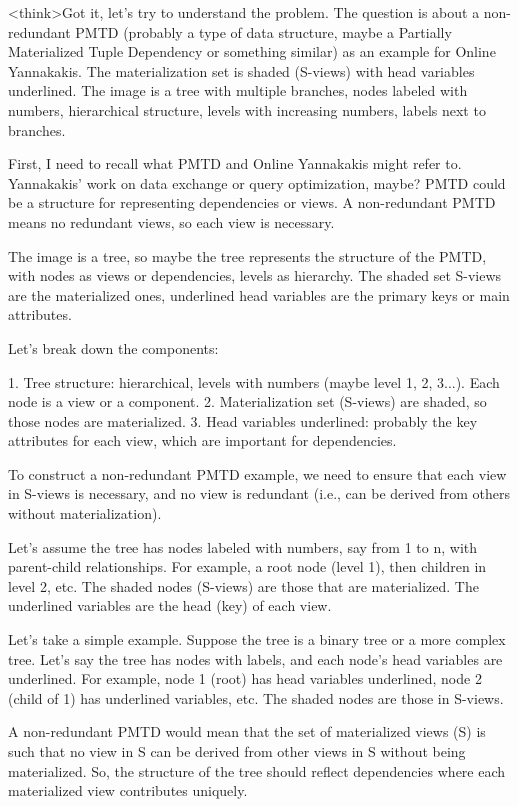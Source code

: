 <think>Got it, let's try to understand the problem. The question is about a non-redundant PMTD (probably a type of data structure, maybe a Partially Materialized Tuple Dependency or something similar) as an example for Online Yannakakis. The materialization set is shaded (S-views) with head variables underlined. The image is a tree with multiple branches, nodes labeled with numbers, hierarchical structure, levels with increasing numbers, labels next to branches.

First, I need to recall what PMTD and Online Yannakakis might refer to. Yannakakis' work on data exchange or query optimization, maybe? PMTD could be a structure for representing dependencies or views. A non-redundant PMTD means no redundant views, so each view is necessary.

The image is a tree, so maybe the tree represents the structure of the PMTD, with nodes as views or dependencies, levels as hierarchy. The shaded set S-views are the materialized ones, underlined head variables are the primary keys or main attributes.

Let's break down the components:

1. Tree structure: hierarchical, levels with numbers (maybe level 1, 2, 3...). Each node is a view or a component.
2. Materialization set (S-views) are shaded, so those nodes are materialized.
3. Head variables underlined: probably the key attributes for each view, which are important for dependencies.

To construct a non-redundant PMTD example, we need to ensure that each view in S-views is necessary, and no view is redundant (i.e., can be derived from others without materialization).

Let's assume the tree has nodes labeled with numbers, say from 1 to n, with parent-child relationships. For example, a root node (level 1), then children in level 2, etc. The shaded nodes (S-views) are those that are materialized. The underlined variables are the head (key) of each view.

Let's take a simple example. Suppose the tree is a binary tree or a more complex tree. Let's say the tree has nodes with labels, and each node's head variables are underlined. For example, node 1 (root) has head variables underlined, node 2 (child of 1) has underlined variables, etc. The shaded nodes are those in S-views.

A non-redundant PMTD would mean that the set of materialized views (S) is such that no view in S can be derived from other views in S without being materialized. So, the structure of the tree should reflect dependencies where each materialized view contributes uniquely.

